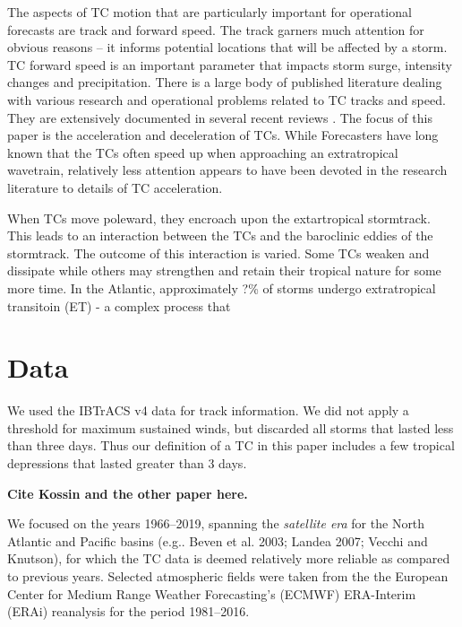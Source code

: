 \documentclass[wcd,manuscript]{copernicus}
\begin{document}
The aspects of TC motion that are particularly important for operational forecasts are track and forward speed. The track garners much attention for obvious reasons -- it  informs  potential locations that will be affected by a storm. TC forward speed is an important parameter that impacts storm surge, intensity changes and precipitation. There is a large body of published literature dealing with various research and operational problems related to TC tracks and speed. They are extensively documented in several recent reviews \citep[e.g.,][]{E2018}. The focus of this paper is the acceleration and deceleration of TCs. While Forecasters have long known that the TCs often speed up when approaching an extratropical wavetrain, relatively less attention appears to have been devoted in the research literature to details of TC acceleration. 

When TCs move poleward, they encroach upon the extartropical stormtrack. This leads to an interaction between the TCs and the baroclinic eddies of the stormtrack. The outcome of this interaction is varied. Some TCs weaken and dissipate while others may strengthen and retain their tropical nature for some more time. In the Atlantic, approximately ?\% of storms undergo  extratropical transitoin (ET) - a complex process that  








\section{Data}
We used the IBTrACS v4 \citep{KnappIBTRaCS} data for track information. We did not apply a threshold for maximum sustained winds, but discarded all storms that lasted less than three days. Thus our definition of a TC in this paper includes a few tropical depressions that lasted greater than 3 days. 

{\bf Cite Kossin and the other paper here.}

We focused on the years 1966--2019, spanning the \emph{satellite era} for the North Atlantic and Pacific basins (e.g.. Beven et al. 2003; Landea 2007; Vecchi and Knutson), for which the TC data is deemed relatively more reliable as compared to previous years. Selected atmospheric fields were taken from the the European Center for Medium Range Weather Forecasting's (ECMWF) ERA-Interim (ERAi) reanalysis \citep{DUS11} for the period 1981--2016.
\end{document}
